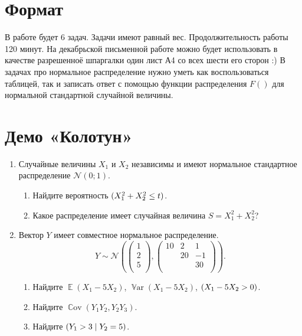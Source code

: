 \documentclass[12pt]{article}
\DeclareMathOperator{\Cov}{\mathbb{C}ov}
\DeclareMathOperator{\Var}{\mathbb{V}ar}
\let\P\relax
\DeclareMathOperator{\P}{\mathbb{P}}
\DeclareMathOperator{\E}{\mathbb{E}}
\newcommand \cN{\mathcal{N}}
\begin{document}
\section*{Формат}

В работе будет 6 задач. 
Задачи имеют равный вес. 
Продолжительность работы 120 минут. 
На декабрьской письменной работе можно будет использовать в качестве разрешенноё шпаргалки один лист А4 со всех шести его сторон :)
В задачах про нормальное распределение нужно уметь как воспользоваться таблицей, так и записать ответ с помощью функции распределения $F()$ для нормальной стандартной случайной величины.

\section*{Демо «Колотун»}
\begin{enumerate}
    \item %
    Случайные величины $X_1$ и $X_2$ независимы и имеют нормальное стандартное распределение $\cN(0;1)$.
    \begin{enumerate}
        \item Найдите вероятность $\P(X_1^2 + X_2^2 \leq t)$.
        \item Какое распределение имеет случайная величина $S = X_1^2 + X_2^2$?
    \end{enumerate}
    
    \item Вектор $Y$ имеет совместное нормальное распределение. 
    \[
    Y \sim \cN\left( \begin{pmatrix}
        1 \\
        2 \\
        5 \\
    \end{pmatrix}, 
    \begin{pmatrix}
        10 & 2 & 1 \\
         & 20 & -1 \\
         & & 30 \\
    \end{pmatrix}
    \right).
    \]
\begin{enumerate}
    \item Найдите $\E(X_1 - 5X_2)$, $\Var(X_1 - 5X_2)$, $\P(X_1 - 5X_2 > 0)$.
    \item Найдите $\Cov(Y_1 Y_2, Y_2 Y_3)$.
    \item Найдите $\P(Y_1 > 3 \mid Y_2 = 5)$.
\end{enumerate}    



\end{enumerate}
\end{document}
